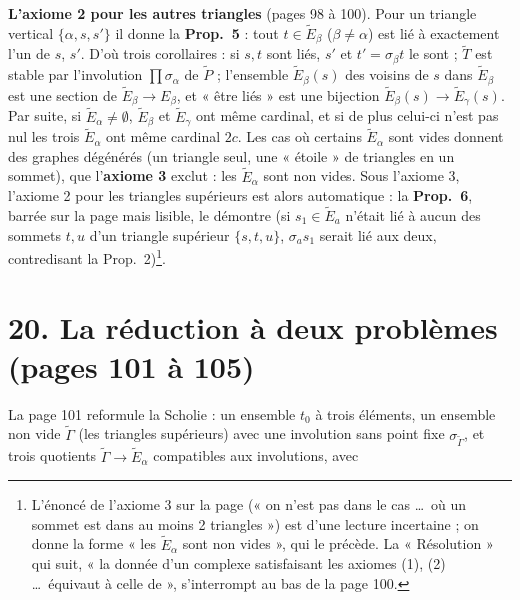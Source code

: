 \documentclass[11pt,a4paper]{article}
\begin{document}
\textbf{L'axiome 2 pour les autres triangles} (pages 98 à 100). Pour un
triangle vertical $\lbrace \alpha, s, s'\rbrace$ il donne la \textbf{Prop.~5} :
tout $t \in \widetilde E_\beta$ ($\beta \neq \alpha$) est lié à exactement l'un
de $s$, $s'$. D'où trois corollaires : si $s, t$ sont liés, $s'$ et $t' =
\sigma_\beta t$ le sont ; $\widetilde T$ est stable par l'involution $\prod
\sigma_\alpha$ de $\widetilde P$ ; l'ensemble $\widetilde E_\beta(s)$ des
voisins de $s$ dans $\widetilde E_\beta$ est une section de $\widetilde E_\beta
\to E_\beta$, et « être liés » est une bijection $\widetilde E_\beta(s) \to
\widetilde E_\gamma(s)$. Par suite, si $\widetilde E_\alpha \neq \emptyset$,
$\widetilde E_\beta$ et $\widetilde E_\gamma$ ont même cardinal, et si de plus
celui-ci n'est pas nul les trois $\widetilde E_\alpha$ ont même cardinal $2c$.
Les cas où certains $\widetilde E_\alpha$ sont vides donnent des graphes
dégénérés (un triangle seul, une « étoile » de triangles en un sommet), que
l'\textbf{axiome 3} exclut : les $\widetilde E_\alpha$ sont non vides. Sous
l'axiome 3, l'axiome 2 pour les triangles supérieurs est alors automatique : la
\textbf{Prop.~6}, barrée sur la page mais lisible, le démontre (si $s_1 \in
\widetilde E_a$ n'était lié à aucun des sommets $t, u$ d'un triangle supérieur
$\lbrace s, t, u\rbrace$, $\sigma_a s_1$ serait lié aux deux, contredisant la
Prop.~2)\footnote{L'énoncé de l'axiome 3 sur la page (« on n'est pas dans le
cas \ldots\ où un sommet est dans au moins 2 triangles ») est d'une lecture
incertaine ; on donne la forme « les $\widetilde E_\alpha$ sont non vides », qui
le précède. La « Résolution » qui suit, « la donnée d'un complexe satisfaisant
les axiomes (1), (2) \ldots\ équivaut à celle de », s'interrompt au bas de la
page 100.}.

\section*{20. La réduction à deux problèmes (pages 101 à 105)}

La page 101 reformule la Scholie : un ensemble $t_0$ à trois éléments, un
ensemble non vide $\widetilde\Gamma$ (les triangles supérieurs) avec une
involution sans point fixe $\sigma_{\widetilde\Gamma}$, et trois quotients
$\widetilde\Gamma \to \widetilde E_\alpha$ compatibles aux involutions, avec
\end{document}
